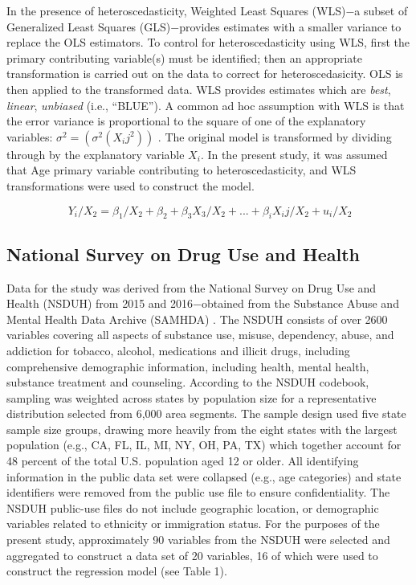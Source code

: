 \documentclass[sigconf]{acmart}
\begin{document}
In the presence of heteroscedasticity, Weighted Least Squares (WLS)$-$a subset 
of Generalized Least Squares (GLS)$-$provides estimates with a smaller variance 
to replace the OLS estimators.  To control for heteroscedasticity using WLS, 
first the primary contributing variable(s) must be identified; then an 
appropriate transformation is carried out on the data to correct for 
heteroscedasicity. OLS is then applied to the transformed data. WLS provides 
estimates which are \textit{best}, \textit{linear}, \textit{unbiased} (i.e., 
``BLUE''). A common ad hoc assumption with WLS is that the error variance is 
proportional to the square of one of the explanatory variables: 
$\sigma^2=(\sigma^2(X_ij^2))$ \cite{gujarati09}. The original model is 
transformed by dividing through by the explanatory variable $X_i$. In the 
present study, it was assumed that Age primary variable contributing to 
heteroscedasticity, and WLS transformations were used to construct the model.

\begin{equation}
  \ Y_i/X_2 = \beta_1/X_2 + \beta_2 +\beta_3X_3/X_2 +... + \beta_iX_ij/X_2 + u_i/X_2
\end{equation}


\subsection{National Survey on Drug Use and Health} 

Data for the study was derived from the National Survey on Drug Use and Health 
(NSDUH) from 2015 and 2016$-$obtained from the Substance Abuse and Mental 
Health Data Archive (SAMHDA) \cite{samhsa16}. The NSDUH consists of over 2600 
variables covering all aspects of substance use, misuse, dependency, abuse, 
and addiction for tobacco, alcohol, medications and illicit drugs, including 
comprehensive demographic information, including health, mental health, 
substance treatment and counseling. According to the NSDUH codebook, sampling 
was weighted across states by population size for a representative distribution 
selected from 6,000 area segments. The sample design used five state sample size 
groups, drawing more heavily from the eight states with the largest population 
(e.g., CA, FL, IL, MI, NY, OH, PA, TX) which together account for 48 percent of 
the total U.S. population aged 12 or older. All identifying information in the 
public data set were collapsed (e.g., age categories) and state identifiers were 
removed from the public use file to ensure confidentiality. The NSDUH public-use 
files do not include geographic location, or demographic variables related to 
ethnicity or immigration status. For the purposes of the present study, 
approximately 90 variables from the NSDUH were selected and aggregated to 
construct a data set of 20 variables, 16 of which were used to construct the 
regression model (see Table 1). 
\end{document}
